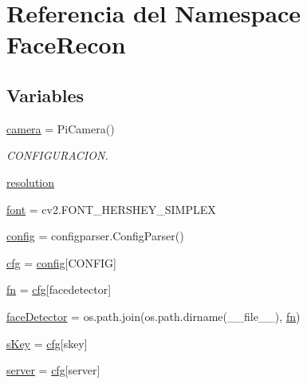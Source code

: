 \hypertarget{namespace_face_recon}{}\section{Referencia del Namespace Face\+Recon}
\label{namespace_face_recon}
\subsection*{Variables}
\begin{DoxyCompactItemize}
\item 
\mbox{\hyperlink{namespace_face_recon_ac6ec5c173cf48f7c65fc970e1e079ca9}{camera}} = Pi\+Camera()
\begin{DoxyCompactList}\small\item\em C\+O\+N\+F\+I\+G\+U\+R\+A\+C\+I\+ON. \end{DoxyCompactList}\item 
\mbox{\hyperlink{namespace_face_recon_a6401bc73862ba52d12acc4e195359b84}{resolution}}
\item 
\mbox{\hyperlink{namespace_face_recon_aa83a22879c0d6299597d46b065e09c4c}{font}} = cv2.\+F\+O\+N\+T\+\_\+\+H\+E\+R\+S\+H\+E\+Y\+\_\+\+S\+I\+M\+P\+L\+EX
\item 
\mbox{\hyperlink{namespace_face_recon_a020b74724169b8fc02c88453680fa3cc}{config}} = configparser.\+Config\+Parser()
\item 
\mbox{\hyperlink{namespace_face_recon_a6a0cb127a374ad0eb5705d0f49a40040}{cfg}} = \mbox{\hyperlink{namespace_face_recon_a020b74724169b8fc02c88453680fa3cc}{config}}\mbox{[}\textquotesingle{}C\+O\+N\+F\+IG\textquotesingle{}\mbox{]}
\item 
\mbox{\hyperlink{namespace_face_recon_aaadefd1ee1352d2f1b2fdf3ea4db8390}{fn}} = \mbox{\hyperlink{namespace_face_recon_a6a0cb127a374ad0eb5705d0f49a40040}{cfg}}\mbox{[}\textquotesingle{}facedetector\textquotesingle{}\mbox{]}
\item 
\mbox{\hyperlink{namespace_face_recon_a52d7b32070be8a278850cdb6afd2d301}{face\+Detector}} = os.\+path.\+join(os.\+path.\+dirname(\+\_\+\+\_\+file\+\_\+\+\_\+), \mbox{\hyperlink{namespace_face_recon_aaadefd1ee1352d2f1b2fdf3ea4db8390}{fn}})
\item 
\mbox{\hyperlink{namespace_face_recon_a5c8b2fa43564cbbd3abf3d1cacef7e8c}{s\+Key}} = \mbox{\hyperlink{namespace_face_recon_a6a0cb127a374ad0eb5705d0f49a40040}{cfg}}\mbox{[}\textquotesingle{}skey\textquotesingle{}\mbox{]}
\item 
\mbox{\hyperlink{namespace_face_recon_a78159752a247e46ae64caea5570a6889}{server}} = \mbox{\hyperlink{namespace_face_recon_a6a0cb127a374ad0eb5705d0f49a40040}{cfg}}\mbox{[}\textquotesingle{}server\textquotesingle{}\mbox{]}

\end{DoxyCompactItemize}
